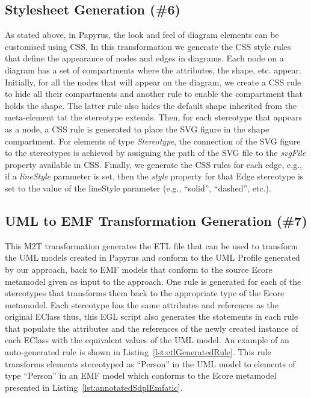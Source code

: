 \subsection{Stylesheet Generation (\#6)}
\label{sec:cssGeneration}
As stated above, in Papyrus, the look and feel of diagram elements can be customised using CSS. 
In this transformation we generate the CSS style rules that define the appearance of nodes and edges in diagrams. 
Each node on a diagram has a set of compartments where the attributes, the shape, etc. appear. 
Initially, for all the nodes that will appear on the diagram, we create a CSS rule to hide all their compartments and another rule to enable the compartment that holds the shape. 
The latter rule also hides the default shape inherited from the meta-element tat the stereotype extends. 
Then, for each stereotype that appears as a node, a CSS rule is generated to place the SVG figure in the shape compartment. 
For elements of type \textit{Stereotype}, the connection of the SVG figure to the stereotypes is achieved by assigning the path of the SVG file to the 
\textit{svgFile} property available in CSS. 
Finally, we generate the CSS rules for each edge, e.g., if a \emph{lineStyle} parameter is set, then the \textit{style} property for that Edge stereotype is set to the value of the lineStyle parameter (e.g., ``solid'', ``dashed'', etc.).

\subsection{UML to EMF Transformation Generation (\#7)}
\label{sec:uml2emf}
This M2T transformation generates the ETL file that can be used to transform the UML models created in Papyrus and conform to the UML Profile generated by 
our approach, back to EMF models that conform to the source Ecore metamodel given as input to the approach. 
One rule is generated for each of the stereotypes that transforms them back to the appropriate type of the Ecore metamodel. 
Each stereotype has the same attributes and references as the original EClass thus, this EGL script also generates the statements in each rule that populate the attributes and the references of the newly created instance of each EClass with the equivalent values of the UML model. 
An example of an auto-generated rule is shown in Listing~\ref{lst:etlGeneratedRule}. 
This rule transforms elements stereotyped as ``Person'' in the UML model to elements of type ``Person'' in an EMF model which conforms to the Ecore metamodel presented in Listing~\ref{lst:annotatedSdplEmfatic}.

